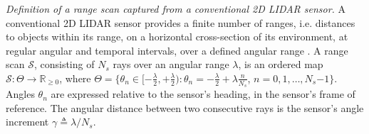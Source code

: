 \begin{definition}
  \label{def:definition_1}
  \textit{Definition of a range scan captured from a conventional 2D LIDAR
  sensor.} A conventional 2D LIDAR sensor provides a finite number of ranges,
  i.e. distances to objects within its range, on a horizontal cross-section of
  its environment, at regular angular and temporal intervals, over a defined
  angular range \cite{lidar}. A range scan $\mathcal{S}$, consisting
  of $N_s$ rays over an angular range $\lambda$, is an ordered map
  $\mathcal{S} : \Theta \rightarrow \mathbb{R}_{\geq 0}$, where $\Theta =
  \{\theta_n \in [-\frac{\lambda}{2}, +\frac{\lambda}{2}) : \theta_n =
  -\frac{\lambda}{2} + \lambda \frac{n}{N_s}$, $n = 0,1,\dots, N_s$$-$$1$$\}$.
  Angles $\theta_n$ are expressed relative to the sensor's heading, in the
  sensor's frame of reference. The angular distance between two consecutive
  rays is the sensor's angle increment $\gamma \triangleq \lambda/N_s$.
\end{definition}



